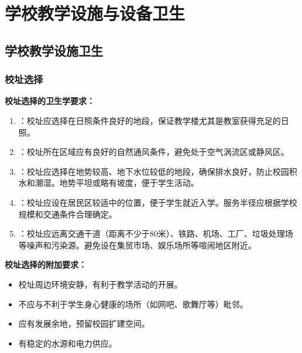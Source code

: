 \chapter{学校教学设施与设备卫生}
\setcounter{chapter}{16}

\section{学校教学设施卫生}

\subsection{校址选择}

\begin{keybox}
\textbf{校址选择的卫生学要求：}

\begin{enumerate}[leftmargin=*]
    \item {}：校址应选择在日照条件良好的地段，保证教学楼尤其是教室获得充足的日照。
    \item {}：校址所在区域应有良好的自然通风条件，避免处于空气涡流区或静风区。
    \item {}：校址应选择在地势较高、地下水位较低的地段，确保排水良好，防止校园积水和潮湿。地势平坦或略有坡度，便于学生活动。
    \item {}：校址应设在居民区较适中的位置，便于学生就近入学。服务半径应根据学校规模和交通条件合理确定。
    \item {}：校址应远离交通干道（距离不少于80米）、铁路、机场、工厂、垃圾处理场等噪声和污染源。避免设在集贸市场、娱乐场所等喧闹地区附近。
\end{enumerate}

\textbf{校址选择的附加要求：}

\begin{itemize}[leftmargin=*]
    \item 校址周边环境安静，有利于教学活动的开展。
    \item 不应与不利于学生身心健康的场所（如网吧、歌舞厅等）毗邻。
    \item 应有发展余地，预留校园扩建空间。
    \item 有稳定的水源和电力供应。
\end{itemize}
\end{keybox}


